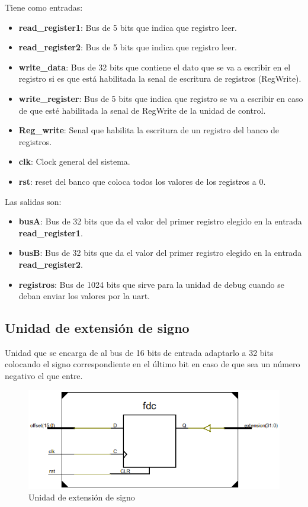 Tiene como entradas:
\begin{itemize}
  \item \textbf{read\_register1}: Bus de 5 bits que indica que registro leer.
  \item \textbf{read\_register2}: Bus de 5 bits que indica que registro leer.
  \item \textbf{write\_data}: Bus de 32 bits que contiene el dato que se va a escribir en el registro si es que est\'a habilitada la senal de escritura de registros (RegWrite).
  \item \textbf{write\_register}: Bus de 5 bits que indica que registro se va a escribir en caso de que est\'e habilitada la senal de RegWrite de la unidad de control.
  \item \textbf{Reg\_write}: Senal que habilita la escritura de un registro del banco de registros.
  \item \textbf{clk}: Clock general del sistema.
  \item \textbf{rst}: reset del banco que coloca todos los valores de los registros a 0.  
\end{itemize}

Las salidas son:
\begin{itemize}
  \item \textbf{busA}: Bus de 32 bits que da el valor del primer registro elegido en la entrada \textbf{read\_register1}.
  \item \textbf{busB}: Bus de 32 bits que da el valor del primer registro elegido en la entrada \textbf{read\_register2}.
  \item \textbf{registros}: Bus de 1024 bits que sirve para la unidad de debug cuando se deban enviar los valores por la uart.
\end{itemize}

\subsection{Unidad de extensi\'on de signo}
Unidad que se encarga de al bus de 16 bits de entrada adaptarlo a 32 bits colocando el signo correspondiente en el \'ultimo bit en caso de que sea un n\'umero negativo el que entre.

\begin{figure}[H]
\centering
\includegraphics[scale=0.5]{img/extension_signo_inside}
\caption{Unidad de extensi\'on de signo}
\label{fig:sign_extended}
\end{figure}


